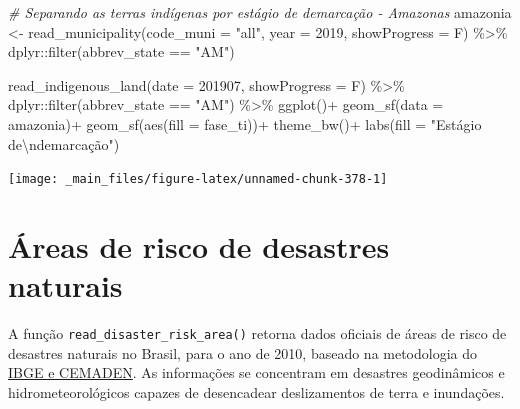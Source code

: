 \documentclass[
  brazilian,
]{book}
\newenvironment{Shaded}{\begin{snugshade}}{\end{snugshade}}
\newcommand{\AttributeTok}[1]{\textcolor[rgb]{0.77,0.63,0.00}{#1}}
\newcommand{\CommentTok}[1]{\textcolor[rgb]{0.56,0.35,0.01}{\textit{#1}}}
\newcommand{\DecValTok}[1]{\textcolor[rgb]{0.00,0.00,0.81}{#1}}
\newcommand{\FunctionTok}[1]{\textcolor[rgb]{0.00,0.00,0.00}{#1}}
\newcommand{\NormalTok}[1]{#1}
\newcommand{\OtherTok}[1]{\textcolor[rgb]{0.56,0.35,0.01}{#1}}
\newcommand{\SpecialCharTok}[1]{\textcolor[rgb]{0.00,0.00,0.00}{#1}}
\newcommand{\StringTok}[1]{\textcolor[rgb]{0.31,0.60,0.02}{#1}}
\begin{document}
\begin{Shaded}
\begin{Highlighting}[]
\CommentTok{\# Separando as terras indígenas por estágio de demarcação {-} Amazonas}
\NormalTok{amazonia }\OtherTok{\textless{}{-}} \FunctionTok{read\_municipality}\NormalTok{(}\AttributeTok{code\_muni =} \StringTok{"all"}\NormalTok{,}
                              \AttributeTok{year =} \DecValTok{2019}\NormalTok{,}
                              \AttributeTok{showProgress =}\NormalTok{ F) }\SpecialCharTok{\%\textgreater{}\%} 
\NormalTok{  dplyr}\SpecialCharTok{::}\FunctionTok{filter}\NormalTok{(abbrev\_state }\SpecialCharTok{==} \StringTok{"AM"}\NormalTok{)}

\FunctionTok{read\_indigenous\_land}\NormalTok{(}\AttributeTok{date =} \DecValTok{201907}\NormalTok{,}
                     \AttributeTok{showProgress =}\NormalTok{ F) }\SpecialCharTok{\%\textgreater{}\%} 
\NormalTok{  dplyr}\SpecialCharTok{::}\FunctionTok{filter}\NormalTok{(abbrev\_state }\SpecialCharTok{==} \StringTok{"AM"}\NormalTok{) }\SpecialCharTok{\%\textgreater{}\%} 
  \FunctionTok{ggplot}\NormalTok{()}\SpecialCharTok{+}
  \FunctionTok{geom\_sf}\NormalTok{(}\AttributeTok{data =}\NormalTok{ amazonia)}\SpecialCharTok{+}
  \FunctionTok{geom\_sf}\NormalTok{(}\FunctionTok{aes}\NormalTok{(}\AttributeTok{fill =}\NormalTok{ fase\_ti))}\SpecialCharTok{+}
  \FunctionTok{theme\_bw}\NormalTok{()}\SpecialCharTok{+}
  \FunctionTok{labs}\NormalTok{(}\AttributeTok{fill =} \StringTok{"Estágio de}\SpecialCharTok{\textbackslash{}n}\StringTok{demarcação"}\NormalTok{)}
\end{Highlighting}
\end{Shaded}

\begin{center}\texttt{[image: \_main\_files/figure-latex/unnamed-chunk-378-1]} \end{center}

\hypertarget{uxe1reas-de-risco-de-desastres-naturais}{%
\section{Áreas de risco de desastres naturais}\label{uxe1reas-de-risco-de-desastres-naturais}}

A função \texttt{read\_disaster\_risk\_area()} retorna dados oficiais de áreas de risco de desastres naturais no Brasil, para o ano de 2010, baseado na metodologia do \href{https://www.ibge.gov.br/geociencias/organizacao-do-territorio/tipologias-do-territorio/21538-populacao-em-areas-de-risco-no-brasil.html}{IBGE e CEMADEN}. As informações se concentram em desastres geodinâmicos e hidrometeorológicos capazes de desencadear deslizamentos de terra e inundações.
\end{document}
